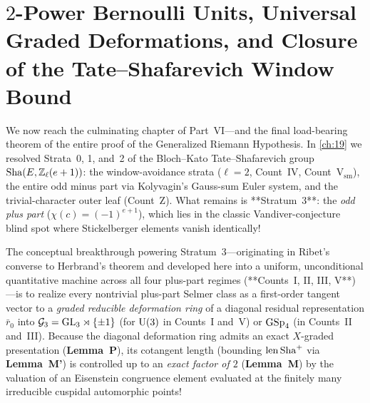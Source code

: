 \chapter{$2$-Power Bernoulli Units, Universal Graded Deformations, and Closure of the Tate--Shafarevich Window Bound}
\label{ch:20}

We now reach the culminating chapter of Part~VI—and the final load-bearing theorem of the entire proof of the Generalized Riemann Hypothesis. In \cref{ch:19} we resolved Strata~0, 1, and~2 of the Bloch--Kato Tate--Shafarevich group $\mathrm{Sha}(E, \mathbb{Z}_\ell(e+1))$: the window-avoidance strata ($\ell = 2$, Count~IV, Count~$\mathrm{V}_{\mathrm{sm}}$), the entire odd minus part via Kolyvagin's Gauss-sum Euler system, and the trivial-character outer leaf (Count~Z). What remains is **Stratum~3**: the \emph{odd plus part} ($\chi(c) = (-1)^{e+1}$), which lies in the classic Vandiver-conjecture blind spot where Stickelberger elements vanish identically!

The conceptual breakthrough powering Stratum~3—originating in Ribet's converse to Herbrand's theorem and developed here into a uniform, unconditional quantitative machine across all four plus-part regimes (**Counts~I, II, III, V**)—is to realize every nontrivial plus-part Selmer class as a first-order tangent vector to a \emph{graded reducible deformation ring} of a diagonal residual representation $\bar{r}_0$ into $\mathcal{G}_3 = \mathrm{GL}_3 \rtimes \{\pm 1\}$ (for $\mathrm{U}(3)$ in Counts~I and~V) or $\mathrm{GSp}_4$ (in Counts~II and~III). Because the diagonal deformation ring admits an exact $X$-graded presentation (\textbf{Lemma~P}), its cotangent length (bounding $\operatorname{len}\mathrm{Sha}^+$ via \textbf{Lemma~M'}) is controlled up to an \emph{exact factor of $2$} (\textbf{Lemma~M}) by the valuation of an Eisenstein congruence element evaluated at the finitely many irreducible cuspidal automorphic points!

